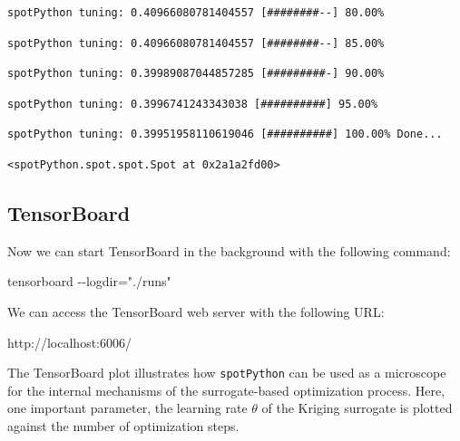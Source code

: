 \documentclass[
  letterpaper,
  DIV=11,
  numbers=noendperiod]{scrreprt}
\newenvironment{Shaded}{\begin{snugshade}}{\end{snugshade}}
\newcommand{\NormalTok}[1]{\textcolor[rgb]{0.00,0.23,0.31}{#1}}
\begin{document}
\begin{verbatim}
spotPython tuning: 0.40966080781404557 [########--] 80.00% 
\end{verbatim}

\begin{verbatim}
spotPython tuning: 0.40966080781404557 [########--] 85.00% 
\end{verbatim}

\begin{verbatim}
spotPython tuning: 0.39989087044857285 [#########-] 90.00% 
\end{verbatim}

\begin{verbatim}
spotPython tuning: 0.3996741243343038 [##########] 95.00% 
\end{verbatim}

\begin{verbatim}
spotPython tuning: 0.39951958110619046 [##########] 100.00% Done...
\end{verbatim}

\begin{verbatim}
<spotPython.spot.spot.Spot at 0x2a1a2fd00>
\end{verbatim}

\hypertarget{tensorboard-7}{%
\subsection{TensorBoard}\label{tensorboard-7}}

Now we can start TensorBoard in the background with the following
command:

\begin{Shaded}
\begin{Highlighting}[]
\NormalTok{tensorboard {-}{-}logdir="./runs"}
\end{Highlighting}
\end{Shaded}

We can access the TensorBoard web server with the following URL:

\begin{Shaded}
\begin{Highlighting}[]
\NormalTok{http://localhost:6006/}
\end{Highlighting}
\end{Shaded}

The TensorBoard plot illustrates how \texttt{spotPython} can be used as
a microscope for the internal mechanisms of the surrogate-based
optimization process. Here, one important parameter, the learning rate
\(\theta\) of the Kriging surrogate is plotted against the number of
optimization steps.
\end{document}
